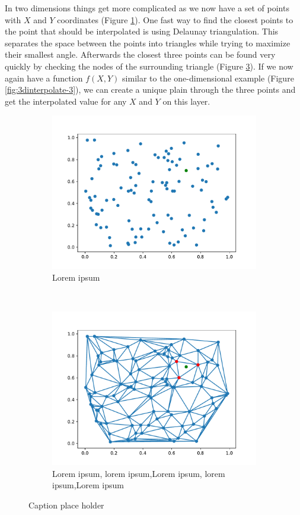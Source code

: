 In two dimensions things get more complicated as we now have a set of points with $X$ and $Y$ coordinates (Figure \ref{fig:3dinterpolate-1}). One fast way to find the closest points to the point that should be interpolated is using Delaunay triangulation. This separates the space between the points into triangles while trying to maximize their smallest angle. Afterwards the closest three points can be found very quickly by checking the nodes of the surrounding triangle  (Figure \ref{fig:3dinterpolate-2}). If we now again have a function $f(X,Y)$ similar to the one-dimensional example (Figure \ref{fig:3dinterpolate-3}), we can create a unique plain through the three points and get the interpolated value for any $X$ and $Y$ on this layer.


\begin{figure}[h] %
	\centering
	\begin{subfigure}[t]{0.5\textwidth}
		\centering
		\includegraphics[width=\linewidth]{images/vis2d1.pdf}
		\caption{Lorem ipsum}
	\label{fig:3dinterpolate-1}
	\end{subfigure}%
	~ 
	\begin{subfigure}[t]{0.5\textwidth}
		\centering
		\includegraphics[width=\linewidth]{images/vis2d2.pdf}
		\caption{Lorem ipsum, lorem ipsum,Lorem ipsum, lorem ipsum,Lorem ipsum}
		\label{fig:3dinterpolate-2}
	\end{subfigure}
	\caption{Caption place holder}


\end{figure}
